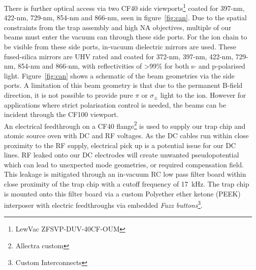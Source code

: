     There is further optical access via
    two CF40 side viewports\footnote{LewVac ZFSVP-DUV-40CF-OUM} coated
    for 397-nm, 422-nm, 729-nm, 854-nm and 866-nm, seen in figure~\ref{fig:can}.  Due to the spatial
    constraints from the trap assembly and high NA objectives, 
    multiple of our beams must enter the vacuum can through these side ports. For the ion chain to be visible from these side ports, in-vacuum dielectric
    mirrors are used. These fused-silica mirrors are UHV rated and coated for 372-nm, 397-nm,
    422-nm, 729-nm, 854-nm and 866-nm, with reflectivities of >99\% for both s-
    and p-polarised light. Figure~\ref{fig:can} shows a schematic of the beam
    geometries via the side ports. A limitation of this beam geometry is that due to the permanent B-field direction, it is not possible to provide pure $\pi$ or $\sigma_{\pm}$ light to the ion. However for applications where strict polarisation control is needed, the beams can be incident through the CF100 viewport.\\
    An electrical feedthrough on a CF40 flange\footnote{Allectra custom} is used to supply our trap chip and atomic source oven with DC and RF voltages. As
    the DC cables run within close proximity to the RF supply, electrical pick
    up is a potential issue for our DC lines. RF leaked onto our DC electrodes
    will create unwanted pseudopotential which can lead to unexpected mode
    geometries, or required compensation field. This leakage is mitigated through
    an in-vacuum RC low pass filter board within close proximity of the trap
    chip with a cutoff frequency of 17~kHz. The trap chip is mounted onto this
    filter board via a custom Polyether ether ketone (PEEK) interposer with
    electric feedthroughs via embedded \emph{Fuzz buttons}\footnote{Custom
    Interconnects}. \\

